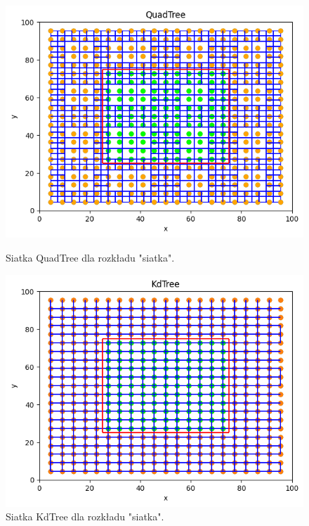 \documentclass{lab}
\begin{document}
\begin{figure}[H]
  \centering
  \begin{minipage}{0.495\textwidth}
      \centering
      \includegraphics[width=1\textwidth]{resources/grid_QuadTree.png}
      \caption{Siatka QuadTree dla rozkładu "siatka".}
      \label{fig:grid_QuadTree}
  \end{minipage}
  \begin{minipage}{0.495\textwidth}
      \centering
      \includegraphics[width=1\textwidth]{resources/grid_KdTree.png}
      \caption{Siatka KdTree dla rozkładu "siatka".}
      \label{fig:grid_KdTree}
  \end{minipage}
\end{figure}
\end{document}
